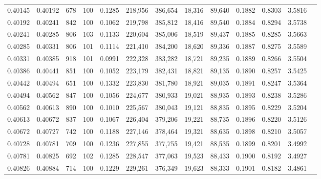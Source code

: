 \begin{tabular}{rrrrrrrrrrrrr}
0.40145 & 0.40192 &   678 & 100 &                                     0.1285 & 218,956 & 386,654 &  18,316 &  89,640 & 0.1882 & 0.8303 & 3.5816 \\
0.40192 & 0.40241 &   842 & 100 &                                     0.1062 & 219,798 & 385,812 &  18,416 &  89,540 & 0.1884 & 0.8294 & 3.5738 \\
0.40241 & 0.40285 &   806 & 103 &                                     0.1133 & 220,604 & 385,006 &  18,519 &  89,437 & 0.1885 & 0.8285 & 3.5663 \\
0.40285 & 0.40331 &   806 & 101 &                                     0.1114 & 221,410 & 384,200 &  18,620 &  89,336 & 0.1887 & 0.8275 & 3.5589 \\
0.40331 & 0.40385 &   918 & 101 &                                     0.0991 & 222,328 & 383,282 &  18,721 &  89,235 & 0.1889 & 0.8266 & 3.5504 \\
0.40386 & 0.40441 &   851 & 100 &                                     0.1052 & 223,179 & 382,431 &  18,821 &  89,135 & 0.1890 & 0.8257 & 3.5425 \\
0.40442 & 0.40494 &   651 & 100 &                                     0.1332 & 223,830 & 381,780 &  18,921 &  89,035 & 0.1891 & 0.8247 & 3.5364 \\
0.40494 & 0.40562 &   847 & 100 &                                     0.1056 & 224,677 & 380,933 &  19,021 &  88,935 & 0.1893 & 0.8238 & 3.5286 \\
0.40562 & 0.40613 &   890 & 100 &                                     0.1010 & 225,567 & 380,043 &  19,121 &  88,835 & 0.1895 & 0.8229 & 3.5204 \\
0.40613 & 0.40672 &   837 & 100 &                                     0.1067 & 226,404 & 379,206 &  19,221 &  88,735 & 0.1896 & 0.8220 & 3.5126 \\
0.40672 & 0.40727 &   742 & 100 &                                     0.1188 & 227,146 & 378,464 &  19,321 &  88,635 & 0.1898 & 0.8210 & 3.5057 \\
0.40728 & 0.40781 &   709 & 100 &                                     0.1236 & 227,855 & 377,755 &  19,421 &  88,535 & 0.1899 & 0.8201 & 3.4992 \\
0.40781 & 0.40825 &   692 & 102 &                                     0.1285 & 228,547 & 377,063 &  19,523 &  88,433 & 0.1900 & 0.8192 & 3.4927 \\
0.40826 & 0.40884 &   714 & 100 &                                     0.1229 & 229,261 & 376,349 &  19,623 &  88,333 & 0.1901 & 0.8182 & 3.4861 \\

\end{tabular}
